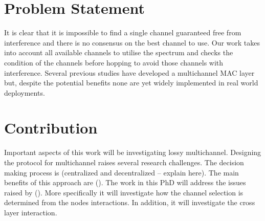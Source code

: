 
\section{Problem Statement}
It is clear that it is impossible to find a single channel guaranteed free from interference and there is no consensus on the best channel to use. Our work takes into account all available channels to utilise the spectrum and checks the condition of the channels before hopping to avoid those channels with interference. Several previous studies have developed a multichannel MAC layer but, despite the potential benefits none are yet widely implemented in real world deployments.

\section{Contribution}
Important aspects of this work will be investigating lossy multichannel. Designing the protocol for multichannel raises several research challenges. The decision making process is (centralized and decentralized – explain here). The main benefits of this approach are (). 
The work in this PhD will address the issues raised by (). More specifically it will investigate how the channel selection is determined from the nodes interactions. In addition, it will investigate the cross layer interaction. 

